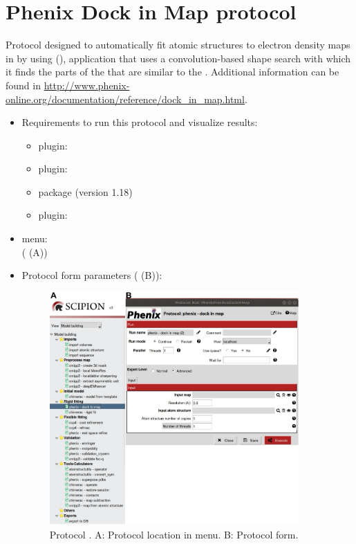 \section{Phenix Dock in Map protocol}
\label{app:dockInMapProtocol}%
Protocol designed to automatically fit atomic structures to electron density maps in \scipion by using \phenix {} (\citep{Liebschner2019}), application that uses a convolution-based shape search with which it finds the parts of the  that are similar to the . Additional information can be found in \url{http://www.phenix-online.org/documentation/reference/dock_in_map.html}.
   
 \begin{itemize}
  \item Requirements to run this protocol and visualize results:
    \begin{itemize}
        \item \scipion plugin: 
        \item \scipion plugin: 
        \item \phenix package (version 1.18)
        \item \scipion plugin: 
    \end{itemize}
  \item \scipion menu:\\
    ( (A))
  
  \item Protocol form parameters ( (B)):
  
    \begin{figure}[H]
     \centering 
     \captionsetup{width=.7\linewidth} 
     \includegraphics[width=0.90\textwidth]{Images_appendix/Fig113.pdf}
     \caption{Protocol . A: Protocol location in \scipion menu. B: Protocol form.}
     \label{fig:app_protocol_dockInMap_1}
    \end{figure}


\end{itemize}
